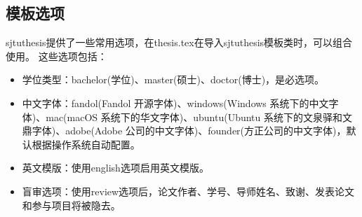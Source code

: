 \subsection{模板选项}
\label{sec:thesisoption}

sjtuthesis提供了一些常用选项，在thesis.tex在导入sjtuthesis模板类时，可以组合使用。
这些选项包括：

\begin{itemize}[noitemsep,topsep=0pt,parsep=0pt,partopsep=0pt]
	\item 学位类型：bachelor(学位)、master(硕士)、doctor(博士)，是必选项。
	\item 中文字体：fandol(Fandol 开源字体)、windows(Windows 系统下的中文字体)、mac(macOS 系统下的华文字体)、ubuntu(Ubuntu 系统下的文泉驿和文鼎字体)、adobe(Adobe 公司的中文字体)、founder(方正公司的中文字体)，默认根据操作系统自动配置。
	\item 英文模版：使用english选项启用英文模版。
	\item 盲审选项：使用review选项后，论文作者、学号、导师姓名、致谢、发表论文和参与项目将被隐去。
\end{itemize}








